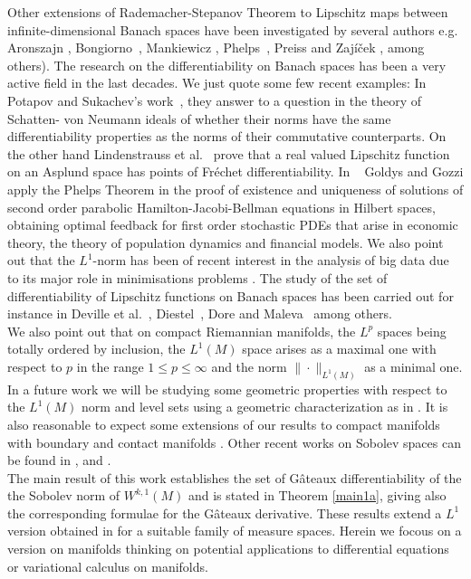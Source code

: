 \documentclass[a4paper,12pt,reqno]{amsart}%
\theoremstyle{definition}
\numberwithin{equation}{section}
\numberwithin{theorem}{section}
\begin{document}
Other extensions of Rademacher-Stepanov Theorem to Lipschitz maps between infinite-dimensional Banach spaces have been investigated by several authors e.g. Aronszajn \cite{ar}, Bongiorno~\cite{bon}, Mankiewicz \cite{man}, Phelps~\cite{ph}, Preiss and Zaj\'i\v{c}ek \cite{pz}, among others). The research on the differentiability on Banach spaces has been a very active field  in the last 
decades. We just quote some  few recent examples: In  Potapov and Sukachev's work~\cite{ps14}, they answer to a question in the theory of Schatten- von Neumann ideals of whether their norms have the same differentiability properties as the norms of their commutative counterparts. On the other hand Lindenstrauss et al.~\cite{lin} prove that a real valued Lipschitz function on an Asplund space has points of Fr\'echet differentiability. In ~\cite{gol} Goldys and Gozzi  apply the Phelps Theorem in the proof of existence and uniqueness of solutions of second order parabolic Hamilton-Jacobi-Bellman equations in Hilbert spaces, obtaining optimal feedback for first order stochastic PDEs that arise in economic theory, the theory of population dynamics and financial models. We also point out that the $L^1$-norm has been of recent interest in the analysis of big data due to its major role in minimisations problems \cite{Yimaw}. The study of the set of differentiability of Lipschitz functions on Banach spaces has been carried out for instance in Deville et al.~\cite{de}, Diestel~\cite{di}, Dore and Maleva~\cite{dore} among others. \\
  
We also point out that on compact Riemannian manifolds, the $L^p$ spaces being  totally ordered by inclusion, the $L^1(M)$ space arises as a maximal one with respect to $p$ in the range $1\leq p\leq\infty$ and  the norm $\|\cdot\|_{L^1(M)}$ as a minimal one. In a  future work we will be studying some geometric properties with respect to the $L^1(M)$ norm and  level sets using a geometric characterization as in \cite{CLin}. It is also reasonable to expect some extensions of our results to compact manifolds with boundary and contact manifolds \cite{sas}. Other recent works on Sobolev spaces can be found in  \cite{Agrawaverma}, \cite{Aramaki} and \cite{Zhang}. \\

The main result of this work  establishes the set of G\^ateaux differentiability of the the Sobolev norm  of $W^{k,1}(M)$ and is stated in  Theorem \ref{main1a}, giving also the corresponding formulae for the G\^ateaux derivative. These results extend a $L^1$ version obtained in \cite{detello} for a suitable family of measure spaces. Herein we focous on a version on manifolds thinking on potential applications to differential equations or variational calculus on manifolds. 
\end{document}
